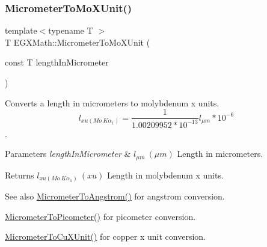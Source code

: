 \subsubsection{\texorpdfstring{Micrometer\+To\+Mo\+X\+Unit()}{MicrometerToMoXUnit()}}
{\footnotesize\ttfamily template$<$typename T $>$ \\
T E\+G\+X\+Math\+::\+Micrometer\+To\+Mo\+X\+Unit (\begin{DoxyParamCaption}\item[{const T}]{length\+In\+Micrometer }\end{DoxyParamCaption})}



Converts a length in micrometers to molybdenum x units. \[ l_{xu(Mo\ K\alpha_1)}=\frac{1}{1.00209952*10^{-13}} l_{\mu m} * 10^{-6}\]. 


\begin{DoxyParams}{Parameters}
{\em length\+In\+Micrometer} & $ l_{\mu m}\ (\mu m)$ Length in micrometers. \\
\hline
\end{DoxyParams}
\begin{DoxyReturn}{Returns}
$ l_{xu(Mo\ K\alpha_1)}\ (xu)$ Length in molybdenum x units. 
\end{DoxyReturn}
\begin{DoxySeeAlso}{See also}
\mbox{\hyperlink{group___e_g_x_math-_conversions-_length_conversions-_s_i-_micrometer-_non-_s_i_ga4b7df35169682046455e9a6f99447777}{Micrometer\+To\+Angstrom()}} for angstrom conversion. 

\mbox{\hyperlink{group___e_g_x_math-_conversions-_length_conversions-_s_i-_micrometer-_s_i_ga912ed4989391eeb5d25f43e99108502e}{Micrometer\+To\+Picometer()}} for picometer conversion. 

\mbox{\hyperlink{group___e_g_x_math-_conversions-_length_conversions-_s_i-_micrometer-_non-_s_i_ga9ec609bbfdde5144c9f40d9093a5b8a7}{Micrometer\+To\+Cu\+X\+Unit()}} for copper x unit conversion. 
\end{DoxySeeAlso}
